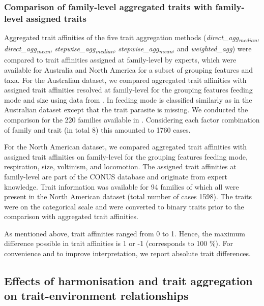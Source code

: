 \documentclass{article}
\begin{document}

\subsubsection*{Comparison of family-level aggregated traits with family-level assigned traits}

Aggregated trait affinities of the five trait aggregation methods (\textit{direct\_agg\textsubscript{median}}, \textit{direct\_agg\textsubscript{mean}}, \textit{stepwise\_agg\textsubscript{median}}, \textit{stepwise\_agg\textsubscript{mean}}, and \textit{weighted\_agg}) were compared to trait affinities assigned at family-level by experts, which were available for Australia and North America for a subset of grouping features and taxa. For the Australian dataset, we compared aggregated trait affinities with assigned trait affinities resolved at family-level for the grouping features feeding mode and size using data from \citet{chessman_dissolved-oxygen_2018}. In \citet{chessman_dissolved-oxygen_2018} feeding mode is classified similarly as in the Australian dataset except that the trait parasite is missing. We conducted the comparison for the 220 families available in \citet{chessman_dissolved-oxygen_2018}. Considering each factor combination of family and trait (in total 8) this amounted to 1760 cases.

For the North American dataset, we compared aggregated trait affinities with assigned trait affinities on family-level for the grouping features feeding mode, respiration, size, voltinism, and locomotion. The assigned trait affinities at family-level are part of the CONUS database and originate from expert knowledge. Trait information was available for 94 families of which all were present in the North American dataset (total number of cases 1598). The traits were on the categorical scale and were converted to binary traits prior to the comparison with aggregated trait affinities.

As mentioned above, trait affinities ranged from 0 to 1. Hence, the maximum difference possible in trait affinities is 1 or -1 (corresponds to 100 \%). For convenience and to improve interpretation, we report absolute trait differences.



\subsection*{Effects of harmonisation and trait aggregation on trait-environment relationships}
\end{document}
